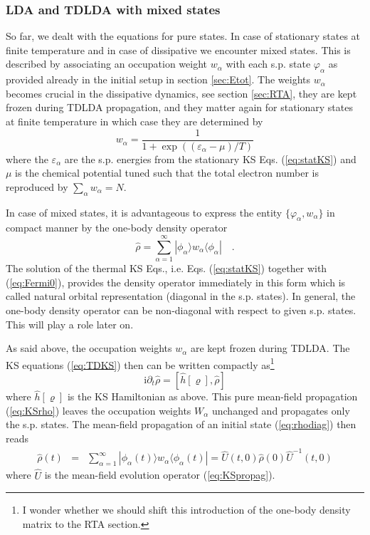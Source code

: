 \documentclass[final,1p]{elsarticle}
\newcommand{\I}{\mathrm{i}}
\newcommand{\PGRfoot}[1]{{\color{blue}\footnote{\color{blue} #1}}}
\begin{document}
\subsubsection{LDA and TDLDA with mixed states}
\label{sec:mix}

So far, we dealt with the equations for pure states.  In case of
stationary states at finite temperature and in case of dissipative we
encounter mixed states.  This is described by associating an
occupation weight $w_\alpha$ with each s.p. state $\varphi_\alpha$ as
provided already in the initial setup in section \ref{sec:Etot}.  The
weights $w_\alpha$ becomes crucial in the dissipative dynamics, see
section \ref{sec:RTA}, they are kept frozen during TDLDA propagation,
and they matter again for stationary states at finite temperature
in which case they are determined by
\begin{equation}
  w_\alpha
  =
  \frac{1}{1+\exp((\varepsilon_\alpha-\mu)/T)}
\label{eq:Fermi0}
\end{equation}
where the $\varepsilon_\alpha$ are the s.p. energies from the
stationary KS Eqs. (\ref{eq:statKS}) and $\mu$ is the chemical
potential tuned such that the total electron number is reproduced by
$\sum_\alpha w_\alpha=N$.

In case of mixed states, it is advantageous to express the
entity $\{\varphi_\alpha,w_\alpha\}$ in compact manner by the one-body
density operator 
\begin{equation}
  \hat{\rho}
  =
  \sum_{\alpha=1}^\infty|\phi_\alpha\rangle w_\alpha\langle\phi_\alpha|
  \quad.
\label{eq:rhodiag}
\end{equation}
The solution of the thermal KS Eqs., i.e. Eqs. (\ref{eq:statKS})
together with (\ref{eq:Fermi0}), provides the density operator
immediately in this form which is called natural orbital
representation (diagonal in the s.p. states). In general, the
one-body density operator can be non-diagonal with respect to given
s.p. states. This will play a role later on.

As said above, the occupation weights $w_\alpha$ are kept frozen
during TDLDA.  The KS equations (\ref{eq:TDKS}) then can be written
compactly as\PGRfoot{I wonder whether we should shift this introduction
of the one-body density matrix to the RTA section.}
\begin{equation}
  \I\partial_t\hat{\rho}
  =
  \left[\hat{h}[\varrho],\hat{\rho}\right]
\label{eq:KSrho}
\end{equation}
where $\hat{h}[\varrho]$ is the KS Hamiltonian as above.
This  pure mean-field propagation (\ref{eq:KSrho})
leaves the occupation weights $W_\alpha$ unchanged and propagates only
the s.p. states.  The mean-field propagation of an initial state
(\ref{eq:rhodiag}) then reads
\begin{eqnarray}
  \hat{\rho}(t)
  &=&
  \sum_{\alpha=1}^\infty
  |\phi_\alpha(t)\rangle w_\alpha\langle\phi_\alpha(t)|
  =
  \hat{U}(t,0)\hat{\rho}(0)\hat{U}^{-1}(t,0)
\label{eq:KSrhoevol}
\end{eqnarray}
where $\hat{U}$ is the mean-field evolution operator (\ref{eq:KSpropag}).
\end{document}
